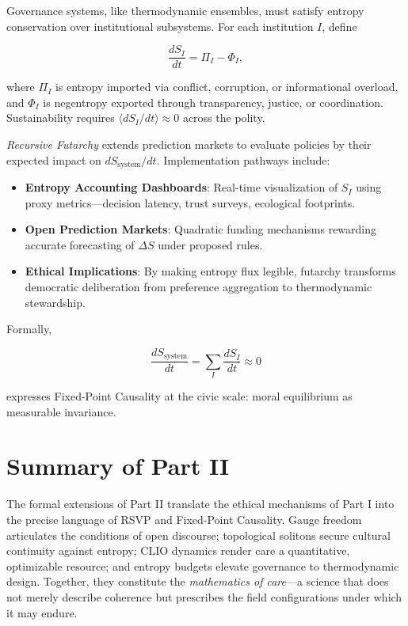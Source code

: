 \documentclass[12pt,a4paper]{article}
\begin{document}
Governance systems, like thermodynamic ensembles, must satisfy entropy conservation over institutional subsystems. For each institution $I$, define

\begin{equation}
\frac{dS_I}{dt} = \Pi_I - \Phi_I,
\end{equation}

where $\Pi_I$ is entropy imported via conflict, corruption, or informational overload, and $\Phi_I$ is negentropy exported through transparency, justice, or coordination. Sustainability requires $\langle dS_I/dt \rangle \approx 0$ across the polity.

\emph{Recursive Futarchy} extends prediction markets to evaluate policies by their expected impact on $dS_{\text{system}}/dt$. Implementation pathways include:

\begin{itemize}
\item \textbf{Entropy Accounting Dashboards}: Real-time visualization of $S_I$ using proxy metrics—decision latency, trust surveys, ecological footprints.
\item \textbf{Open Prediction Markets}: Quadratic funding mechanisms rewarding accurate forecasting of $\Delta S$ under proposed rules.
\item \textbf{Ethical Implications}: By making entropy flux legible, futarchy transforms democratic deliberation from preference aggregation to thermodynamic stewardship.
\end{itemize}

Formally,

\begin{equation}
\frac{dS_{\text{system}}}{dt} = \sum_I \frac{dS_I}{dt} \approx 0
\end{equation}

expresses Fixed-Point Causality at the civic scale: moral equilibrium as measurable invariance.

\section*{Summary of Part II}

The formal extensions of Part II translate the ethical mechanisms of Part I into the precise language of RSVP and Fixed-Point Causality. Gauge freedom articulates the conditions of open discourse; topological solitons secure cultural continuity against entropy; CLIO dynamics render care a quantitative, optimizable resource; and entropy budgets elevate governance to thermodynamic design. Together, they constitute the \emph{mathematics of care}—a science that does not merely describe coherence but prescribes the field configurations under which it may endure.
\end{document}
